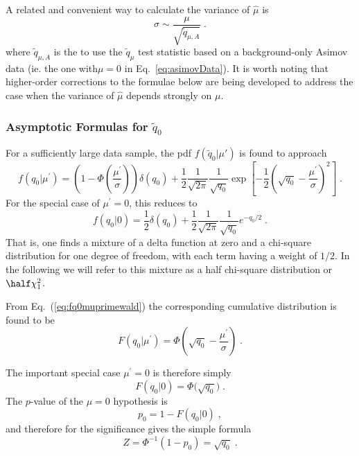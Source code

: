 A related and convenient way to calculate the variance of $\hat\mu$ is 
\begin{equation}
\label{eq:sigmaofmu}
\sigma \sim \frac{\mu}{\sqrt {\tilde q_{\mu,A}}} \;.
\end{equation}
where $\tilde q_{\mu,A}$ is the to use the $\tilde q_\mu$ test statistic based on a background-only Asimov data (ie. the one with$\mu=0$ in Eq.~\ref{eq:asimovData}).  It is worth noting that higher-order corrections to the formulae below are being developed to address the case when the variance of $\hat\mu$ depends strongly on $\mu$.


\subsubsection{Asymptotic Formulas for $\tilde q_{0}$}
For a sufficiently large data sample,  the pdf $f(\tilde{q}_{0} | \mu')$ is found to approach
\begin{equation}
\label{eq:fq0muprimewald}
f(q_0 | \mu^{\prime}) = \left( 1 - 
\Phi \left( \frac{ \mu^{\prime}}{\sigma} \right) \right) \delta(q_0)  + 
\frac{1}{2}
\frac{1}{\sqrt{2 \pi}} \frac{1}{\sqrt{q_0}} \exp 
\left[ - \frac{1}{2} \left( \sqrt{q_0} - \frac{\mu^{\prime}}{\sigma} 
\right)^2 \right] 
\;.
\end{equation}
For the special case of $\mu^{\prime} = 0$, this reduces to
\begin{equation}
\label{eq:fq00}
f(q_0 | 0) = \frac{1}{2} \delta(q_0) + 
\frac{1}{2} \frac{1}{\sqrt{2 \pi}} \frac{1}{\sqrt{q_0}} e^{-q_0/2} \;.
\end{equation}
That is, one finds a mixture of a delta function at zero and
a chi-square distribution for one degree of freedom, with each term
having a weight of $1/2$.  In the following we will refer to this
mixture as a half chi-square distribution or $\half \chi^2_1$.


From Eq.~(\ref{eq:fq0muprimewald}) the corresponding cumulative
distribution is found to be
\begin{equation}
\label{cdfq0muprimewald}
F(q_0 | \mu^{\prime}) = \Phi \left( \sqrt{q_0} - \frac{\mu^{\prime}}{\sigma} 
\right) \;.
\end{equation}


The important special case $\mu^{\prime} = 0$ is therefore simply
\begin{equation}
\label{cdfq00wald}
F(q_0 | 0) = \Phi \Big( \sqrt{q_0} \Big)
\;.
\end{equation}
The $p$-value of the $\mu=0$ hypothesis is 
\begin{equation}
\label{eq:pval0}
p_0 = 1 - F(q_0 | 0) \;, 
\end{equation}
and therefore for the significance gives the simple formula
\begin{equation}
\label{eq:Z0}
Z = \Phi^{-1}(1 - p_0) = \sqrt{q_0} \;.
\end{equation}


